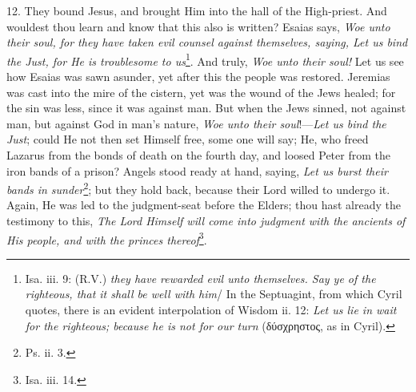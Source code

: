 12. They bound Jesus, and brought Him into the hall of the High-priest. And wouldest thou learn and know that this also is written? Esaias says, \emph{Woe unto their soul, for they have taken evil counsel against themselves, saying, Let us bind the Just, for He is troublesome to us}\footnote{Isa. iii. 9: (R.V.) \emph{they have rewarded evil unto themselves. Say ye of the righteous, that it shall be well with him}/ In the Septuagint, from which Cyril quotes, there is an evident interpolation of Wisdom ii. 12: \emph{Let us lie in wait for the righteous; because he is not for our turn} (\textgreek{δύσχρηστος}, as in Cyril).}. And truly, \emph{Woe unto their soul! } Let us see how Esaias was sawn asunder, yet after this the people was restored. Jeremias was cast into the mire of the cistern, yet was the wound of the Jews healed; for the sin was less, since it was against man. But when the Jews sinned, not against man, but against God in man’s nature, \emph{Woe unto their soul}!—\emph{Let us bind the Just}; could He not then set Himself free, some one will say; He, who freed Lazarus from the bonds of death on the fourth day, and loosed Peter from the iron bands of a prison? Angels stood ready at hand, saying, \emph{Let us burst their bands in sunder}\footnote{Ps. ii. 3.}; but they hold back, because their Lord willed to undergo it. Again, He was led to the judgment-seat before the Elders; thou hast already the testimony to this, \emph{The Lord Himself will come into judgment with the ancients of His people, and with the princes thereof}\footnote{Isa. iii. 14.}.

